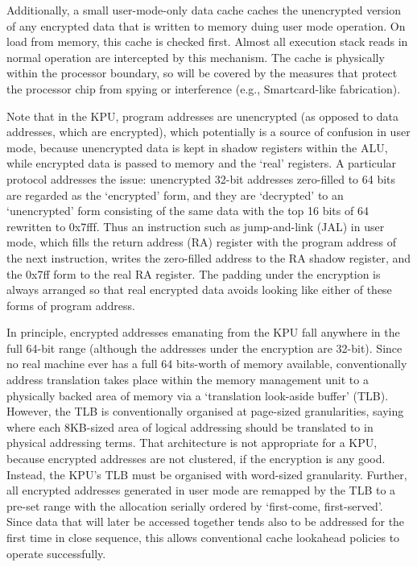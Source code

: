 \documentclass[conference]{IEEEtran}
\begin{document}
Additionally, a small user-mode-only data cache caches the unencrypted
version of any encrypted data that is written to memory duing user mode
operation.  On load from memory, this cache is checked first.  Almost
all execution stack reads in normal operation are intercepted by this
mechanism.  The cache is physically within the processor boundary, so
will be covered by the measures that protect the processor chip from
spying or interference (e.g., Smartcard-like fabrication).

Note that in the KPU, program addresses are unencrypted (as opposed to
data addresses, which are encrypted), which potentially is a source
of confusion in user mode, because unencrypted data is kept in shadow
registers within the ALU, while encrypted data is passed to memory
and the `real' registers. A particular protocol addresses the issue:
unencrypted 32-bit addresses zero-filled to 64 bits are regarded as the
`encrypted' form, and they are `decrypted' to an `unencrypted' form
consisting of the same data with the top 16 bits of 64 rewritten to
0x7fff.  Thus an instruction such as jump-and-link (JAL) in user mode,
which fills the return address (RA) register with the program address of
the next instruction, writes the zero-filled address to the RA shadow
register, and the 0x7ff form to the real RA register. The padding
under the encryption is always arranged so that real encrypted data
avoids looking like either of these forms of program address.

In principle, encrypted addresses emanating from the KPU fall anywhere in
the full 64-bit range (although the addresses under the encryption are
32-bit).  Since no real machine ever has a full 64 bits-worth of memory
available, conventionally address translation takes place
within the memory management unit to a physically backed area of memory
via a `translation look-aside buffer' (TLB).  However, the TLB is
conventionally organised at page-sized granularities, saying where each
8KB-sized area of logical addressing should be translated to in physical
addressing terms.  That architecture is not appropriate for a KPU,
because encrypted addresses are not clustered, if the encryption
is any good.  Instead, the KPU's TLB must be organised with word-sized
granularity.  Further, all encrypted addresses generated in user mode
are remapped by the TLB to a pre-set range with the allocation serially
ordered by `first-come, first-served'.  Since data that will later be
accessed together tends also to be addressed for the first time in close
sequence, this allows conventional cache lookahead policies to operate
successfully.
\end{document}
